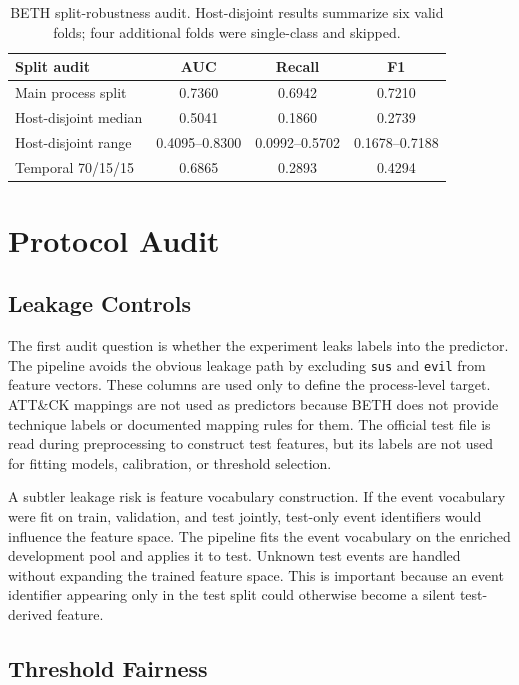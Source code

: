 \documentclass[10pt,journal,compsoc]{IEEEtran}
\begin{document}
\begin{table}[t]
\centering
\caption{BETH split-robustness audit. Host-disjoint results summarize six valid folds; four additional folds were single-class and skipped.}
\label{tab:beth_group_temporal}
\begin{tabular}{lccc}
\toprule
\textbf{Split audit} & \textbf{AUC} & \textbf{Recall} & \textbf{F1} \\
\midrule
Main process split & 0.7360 & 0.6942 & 0.7210 \\
Host-disjoint median & 0.5041 & 0.1860 & 0.2739 \\
Host-disjoint range & 0.4095--0.8300 & 0.0992--0.5702 & 0.1678--0.7188 \\
Temporal 70/15/15 & 0.6865 & 0.2893 & 0.4294 \\
\bottomrule
\end{tabular}
\end{table}

\section{Protocol Audit}
\label{sec:audit}

\subsection{Leakage Controls}

The first audit question is whether the experiment leaks labels into the predictor. The pipeline avoids the obvious leakage path by excluding \texttt{sus} and \texttt{evil} from feature vectors. These columns are used only to define the process-level target. ATT\&CK mappings are not used as predictors because BETH does not provide technique labels or documented mapping rules for them. The official test file is read during preprocessing to construct test features, but its labels are not used for fitting models, calibration, or threshold selection.

A subtler leakage risk is feature vocabulary construction. If the event vocabulary were fit on train, validation, and test jointly, test-only event identifiers would influence the feature space. The pipeline fits the event vocabulary on the enriched development pool and applies it to test. Unknown test events are handled without expanding the trained feature space. This is important because an event identifier appearing only in the test split could otherwise become a silent test-derived feature.

\subsection{Threshold Fairness}
\end{document}
